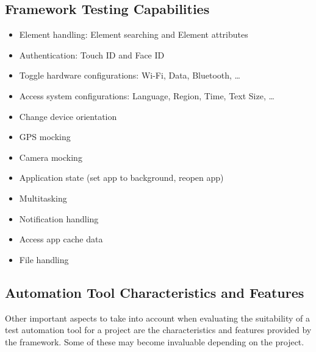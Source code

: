 \subsection {Framework Testing Capabilities}
	\begin{itemize}
  		\vspace{-0.4cm}\item Element handling: Element searching and Element attributes
		\vspace{-0.4cm}\item Authentication: Touch ID and Face ID
		\vspace{-0.4cm}\item Toggle hardware configurations: Wi-Fi, Data, Bluetooth, …
		\vspace{-0.4cm}\item Access system configurations: Language, Region, Time, Text Size, …
		\vspace{-0.4cm}\item Change device orientation
		\vspace{-0.4cm}\item GPS mocking
		\vspace{-0.4cm}\item Camera mocking
		\vspace{-0.4cm}\item Application state (set app to background, reopen app)
		\vspace{-0.4cm}\item Multitasking
		\vspace{-0.4cm}\item Notification handling
		\vspace{-0.4cm}\item Access app cache  data
		\vspace{-0.4cm}\item File handling
	\end{itemize}
	
\subsection {Automation Tool Characteristics and Features}

Other important aspects to take into account when evaluating the suitability of a test automation tool for a project are the characteristics and features provided by the framework. Some of these may become invaluable depending on the project. 

